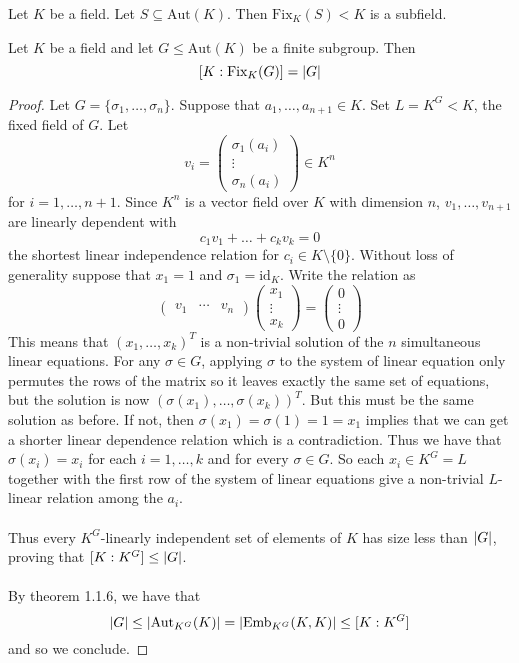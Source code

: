 \documentclass[a4paper]{article}
\begin{document}
\begin{lmm}{}{} Let $K$ be a field. Let $S\subseteq\text{Aut}(K)$. Then $\text{Fix}_K(S)<K$ is a subfield. 
\end{lmm}

\begin{prp}{}{} Let $K$ be a field and let $G\leq\text{Aut}(K)$ be a finite subgroup. Then $$[K:\text{Fix}_K(G)]=\abs{G}$$ \tcbline
\begin{proof}
Let $G=\{\sigma_1,\dots,\sigma_n\}$. Suppose that $a_1,\dots,a_{n+1}\in K$. Set $L=K^G<K$, the fixed field of $G$. Let $$v_i=\begin{pmatrix}
\sigma_1(a_i)\\
\vdots\\
\sigma_n(a_i)
\end{pmatrix}\in K^n$$ for $i=1,\dots,n+1$. Since $K^n$ is a vector field over $K$ with dimension $n$, $v_1,\dots,v_{n+1}$ are linearly dependent with $$c_1v_1+\dots+c_kv_k=0$$ the shortest linear independence relation for $c_i\in K\setminus\{0\}$. Without loss of generality suppose that $x_1=1$ and $\sigma_1=\text{id}_K$. Write the relation as $$\begin{pmatrix}
v_1 & \cdots & v_n
\end{pmatrix}\begin{pmatrix}
x_1\\\vdots\\x_k
\end{pmatrix}=\begin{pmatrix}
0\\
\vdots\\
0
\end{pmatrix}$$ This means that $(x_1,\dots,x_k)^T$ is a non-trivial solution of the $n$ simultaneous linear equations. For any $\sigma\in G$, applying $\sigma$ to the system of linear equation only permutes the rows of the matrix so it leaves exactly the same set of equations, but the solution is now $(\sigma(x_1),\dots,\sigma(x_k))^T$. But this must be the same solution as before. If not, then $\sigma(x_1)=\sigma(1)=1=x_1$ implies that we can get a shorter linear dependence relation which is a contradiction. Thus we have that $\sigma(x_i)=x_i$ for each $i=1,\dots,k$ and for every $\sigma\in G$. So each $x_i\in K^G=L$ together with the first row of the system of linear equations give a non-trivial $L$-linear relation among the $a_i$. \\~\\

Thus every $K^G$-linearly independent set of elements of $K$ has size less than $\abs{G}$, proving that $[K:K^G]\leq\abs{G}$. \\~\\

By theorem 1.1.6, we have that $$\abs{G}\leq\abs{\text{Aut}_{K^G}(K)}=\abs{\text{Emb}_{K^G}(K,K)}\leq[K:K^G]$$ and so we conclude. 
\end{proof}
\end{prp}
\end{document}
